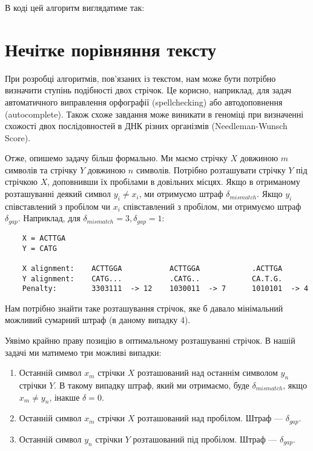 \documentclass[12pt,a4paper]{report}
\begin{document}
В коді цей алгоритм виглядатиме так:





\section{Нечітке порівняння тексту}

При розробці алгоритмів, пов’язаних із текстом, нам може бути потрібно визначити ступінь подібності двох стрічок. Це корисно, наприклад, для задач автоматичного виправлення орфографії (spellchecking) або автодоповнення (autocomplete). Також схоже завдання може виникати в геноміці при визначенні схожості двох послідовностей в ДНК різних організмів (Needleman-Wunsch Score).

Отже, опишемо задачу більш формально. Ми маємо стрічку \(X\) довжиною \(m\) символів та стрічку \(Y\) довжиною \(n\) символів. Потрібно розташувати стрічку \(Y\) під стрічкою \(X\), доповнивши їх пробілами в довільних місцях. Якщо в отриманому розташуванні деякий символ \(y_i \neq x_i\), ми отримуємо штраф \(\delta_{mismatch}\). Якщо \(y_i\) співставлений з пробілом чи \(x_i\) співставлений з пробілом, ми отримуємо штраф \(\delta_{gap}\). Наприклад, для \(\delta_{mismatch} = 3, \delta_{gap} = 1\):

\begin{lstlisting}
    X = ACTTGA
    Y = CATG

    X alignment:    ACTTGGA           ACTTGGA            .ACTTGA
    Y alignment:    CATG...           .CATG..            CA.T.G.
    Penalty:        3303111  -> 12    1030011  -> 7      1010101  -> 4
\end{lstlisting}

Нам потрібно знайти таке розташування стрічок, яке б давало мінімальний можливий сумарний штраф (в даному випадку 4).

Уявімо крайню праву позицію в оптимальному розташуванні стрічок. В нашій задачі ми матимемо три можливі випадки:

\begin{enumerate}
    \item Останній символ \(x_m\) стрічки \(X\) розташований над останнім символом \(y_n\) стрічки \(Y\). В такому випадку штраф, який ми отримаємо, буде \(\delta_{mismatch}\), якщо \(x_m \neq y_n\), інакше \(\delta = 0\).
    \item Останній символ \(x_m\) стрічки \(X\) розташований над пробілом. Штраф --- \(\delta_{gap}\).
    \item Останній символ \(y_n\) стрічки \(Y\) розташований під пробілом. Штраф --- \(\delta_{gap}\).
\end{enumerate}
\end{document}
